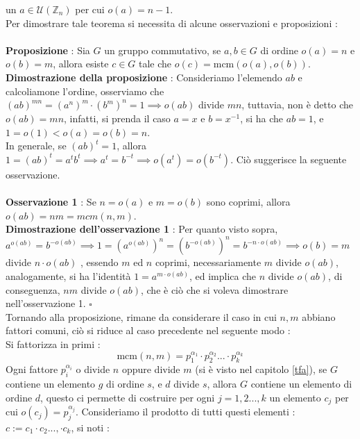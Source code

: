 \documentclass[12pt, letterpaper]{article}
\newcommand{\Z}{{\mathbb Z}}
\newcommand{\mcm}{{\text{mcm}}}
\begin{document}
un \(a\in\mathcal{U}(\Z_n)\) per cui \(o(a)=n-1\).
\\Per dimostrare tale teorema si necessita di alcune osservazioni e proposizioni :\\\hphantom{}\\ 
\textbf{Proposizione} : Sia \(G\) un gruppo commutativo, se \(a,b\in G\) di 
ordine \(o(a)=n\) e \(o(b)=m\), allora esiste \(c\in G\) tale che 
\(o(c)=\mcm(o(a),o(b))\).\\
\textbf{Dimostrazione della proposizione} : Consideriamo l'elemendo \(ab\) e calcoliamone l'ordine, 
osserviamo che \((ab)^{mn}=(a^n)^m\cdot (b^m)^n=1\implies o(ab)\) divide \(mn\), tuttavia, non è 
detto che \(o(ab)=mn\), infatti, si prenda il caso \(a=x\) e \(b=x^{-1}\), si ha che 
\(ab=1\), e \(1=o(1)<o(a)=o(b)=n\).\\ In generale, se \((ab)^t=1\), allora 
\(1=(ab)^t=a^tb^t\implies a^t=b^{-t}\implies o(a^t)=o(b^{-t})\). Ciò suggerisce la 
seguente osservazione.\\\hphantom{}\\
\textbf{Osservazione 1} : Se \(n=o(a)\) e \(m=o(b)\) sono coprimi, allora \(o(ab)=nm=mcm(n,m)\).\\
\textbf{Dimostrazione dell'osservazione 1} : Per quanto visto sopra, \(a^{o(ab)}=b^{-o(ab)}
\implies 1=(a^{o(ab)})^n=(b^{-o(ab)})^n =b^{-n \cdot o(ab)}\implies o(b)=m\) divide \(n\cdot o(ab)\)
, essendo \(m\) ed \(n\) coprimi, necessariamente \(m\) divide \(o(ab)\), analogamente, 
si ha l'identità \(1=a^{m\cdot o(ab)}\), ed implica che \(n\) divide \(o(ab)\), di conseguenza,
\(nm\) divide \(o(ab)\), che è ciò che si voleva dimostrare nell'osservazione 1. \(\square\)
\\Tornando alla proposizione, rimane da considerare il caso in cui \(n,m\) abbiano fattori 
comuni, ciò si riduce al caso precedente nel seguente modo :\\
Si fattorizza in primi : \begin{equation}
    \mcm(n,m)=p_1^{\alpha_1}\cdot p_2^{\alpha_2}...\cdot p_k^{\alpha_k}
\end{equation} 
Ogni fattore \(p_i^{\alpha_i}\) o divide \(n\) oppure divide \(m\) (si è visto nel capitolo \ref{tfa}), se 
\(G\) contiene un elemento \(g\) di ordine \(s\), e \(d\) divide \(s\), allora 
\(G\) contiene un elemento di ordine \(d\), questo ci permette di costruire per 
ogni \(j=1,2...,k\) un elemento \(c_j\) per cui \(o(c_j)= p_j^{\alpha_j}\). Consideriamo 
il prodotto di tutti questi elementi : \(c:=c_1\cdot c_2...,\cdot c_k\), si noti :\\\hphantom{}\\
\end{document}
